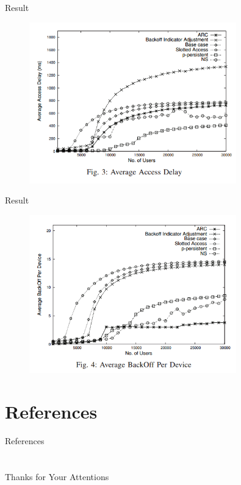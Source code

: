\documentclass{beamer}
\begin{document}
\begin{frame}{Result}
    \begin{figure}[t]
        \centering
        \includegraphics[width=0.8\textwidth]{figures/f2.png}
    \end{figure}
\end{frame}
\begin{frame}{Result}
    \begin{figure}[t]
        \centering
        \includegraphics[width=0.8\textwidth]{figures/f3.png}
    \end{figure}
\end{frame}

\section{References}
\calcreferencespagetotal %
\begin{frame}[allowframebreaks]{References}
    \fontsize{9pt}{13}\selectfont
    
    
\end{frame}

\section{}

\begin{frame}
    \centering
    \Large{Thanks for Your Attentions}
\end{frame}
\end{document}
